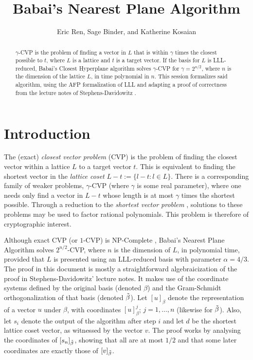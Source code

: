 \documentclass[11pt,a4paper]{article}
\begin{document}
\title{Babai's Nearest Plane Algorithm}
\author{Eric Ren, Sage Binder, and Katherine Kosaian}
\maketitle

\begin{abstract}
   $\gamma$-CVP is the problem of finding a vector in $L$ that is within $\gamma$ times the closest possible to $t$, where $L$ is a lattice and $t$ is a target vector. If the basis for $L$ is LLL-reduced, Babai's Closest Hyperplane algorithm solves $\gamma$-CVP for $\gamma=2^{n/2}$, where $n$ is the dimension of the lattice $L$, in time polynomial in $n$. This session formalizes said algorithm, using the AFP formalization of LLL \cite{LLL_Factorization-AFP,Modular_arithmetic_LLL_and_HNF_algorithms-AFP} and adapting a proof of correctness from the lecture notes of Stephens-Davidowitz \cite{Stephens_Davidowitz}.
\end{abstract}

\tableofcontents

\section{Introduction}

The (exact) \emph{closest vector problem} (CVP) is the problem of finding the closest vector within a lattice $L$ to a target vector $t$. This is equivalent to finding the shortest vector in the \emph{lattice coset} $L-t:=\{l-t:l\in L\}$. There is a corresponding family of weaker problems, $\gamma$-CVP (where $\gamma$ is some real parameter), where one needs only find a vector in $L-t$ whose length is at most $\gamma$ times the shortest possible. Through a reduction to the \emph{shortest vector problem} \cite{Stephens_Davidowitz}, solutions to these problems may be used to factor rational polynomials. This problem is therefore of cryptographic interest.

Although exact CVP (or $1$-CVP) is NP-Complete \cite{CVP_Hardness-AFP}, Babai's Nearest Plane Algorithm solves $2^{n/2}$-CVP, where $n$ is the dimension of $L$, in polynomial time, provided that $L$ is presented using an LLL-reduced basis with parameter $\alpha=4/3$. The proof in this document is mostly a straightforward algebraicization of the proof in Stephens-Davidowitz' lecture notes. It makes use of the coordinate systems defined by the original basis
(denoted $\beta$) and the Gram-Schmidt orthogonalization of that basis (denoted $\Tilde{\beta}$).
Let $[u]_{\beta}$ denote the representation of a vector $u$ under $\beta$, with coordinates
$[u]_{\beta}^j$; $j=1,...,n$ (likewise for $\Tilde{\beta}$).
Also, let $s_i$ denote the output of the algorithm after step $i$ and let $d$ be the shortest 
lattice coset vector, as witnessed by the vector $v$. The proof works by analysing the coordinates of
$[s_n]_{\Tilde{\beta}}$, showing that all are at most $1/2$ and that some later coordinates are
exactly those of $[v]_{\Tilde{\beta}}$.
\end{document}
